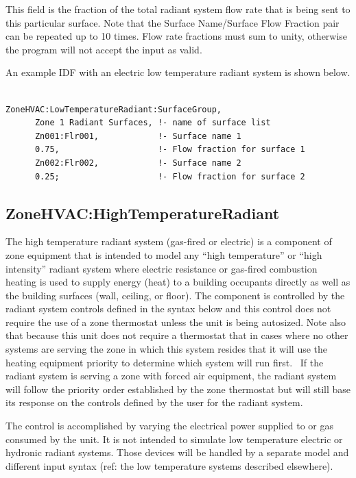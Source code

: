 This field is the fraction of the total radiant system flow rate that is being sent to this particular surface. Note that the Surface Name/Surface Flow Fraction pair can be repeated up to 10 times. Flow rate fractions must sum to unity, otherwise the program will not accept the input as valid.

An example IDF with an electric low temperature radiant system is shown below.

\begin{lstlisting}

ZoneHVAC:LowTemperatureRadiant:SurfaceGroup,
      Zone 1 Radiant Surfaces, !- name of surface list
      Zn001:Flr001,            !- Surface name 1
      0.75,                    !- Flow fraction for surface 1
      Zn002:Flr002,            !- Surface name 2
      0.25;                    !- Flow fraction for surface 2
\end{lstlisting}

\subsection{ZoneHVAC:HighTemperatureRadiant}\label{zonehvachightemperatureradiant}

The high temperature radiant system (gas-fired or electric) is a component of zone equipment that is intended to model any ``high temperature'' or ``high intensity'' radiant system where electric resistance or gas-fired combustion heating is used to supply energy (heat) to a building occupants directly as well as the building surfaces (wall, ceiling, or floor). The component is controlled by the radiant system controls defined in the syntax below and this control does not require the use of a zone thermostat unless the unit is being autosized. Note also that because this unit does not require a thermostat that in cases where no other systems are serving the zone in which this system resides that it will use the heating equipment priority to determine which system will run first.~ If the radiant system is serving a zone with forced air equipment, the radiant system will follow the priority order established by the zone thermostat but will still base its response on the controls defined by the user for the radiant system.

The control is accomplished by varying the electrical power supplied to or gas consumed by the unit. It is not intended to simulate low temperature electric or hydronic radiant systems. Those devices will be handled by a separate model and different input syntax (ref: the low temperature systems described elsewhere).

